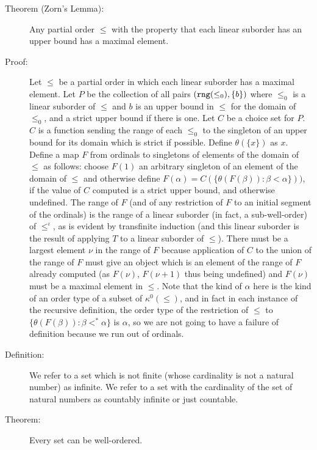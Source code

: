 \documentclass[12pt]{article}
\begin{document}
\begin{description}

\item[Theorem (Zorn's Lemma):]  Any partial order $\leq$ with the property that each linear suborder has an upper bound  has a maximal element.

\item[Proof:]  Let $\leq$ be a partial order in which each linear suborder has a maximal element.  Let $P$ be the collection of all pairs $({\tt rng}(\leq_0),\{b\})$ where $\leq_0$ is a linear suborder of $\leq$ and $b$ is an upper bound in $\leq$ for the domain of $\leq_0$, and a strict upper bound if there is one.  Let $C$ be a choice set for $P$.  $C$ is a function sending the range of each $\leq_0$ to
the singleton of an upper bound for its domain which is strict if possible.  Define $\theta(\{x\})$ as $x$.  Define a map $F$ from ordinals to singletons of elements of the domain of $\leq$ as follows: choose $F(1)$ an arbitrary singleton of an element of the domain of $\leq$ and otherwise define  $F(\alpha) =  C(\{\theta(F(\beta)):\beta<\alpha\}))$, if the value of $C$ computed is a strict upper bound, and otherwise undefined.  The range of $F$ (and of any restriction of $F$ to an initial segment of the ordinals)  is the range of a linear suborder (in fact, a sub-well-order) of $\leq^{\iota}$, as is evident by transfinite induction (and this linear suborder is the result of applying $T$ to a linear suborder of $\leq$).  There must be a largest element $\nu$ in
the range of $F$ because application of $C$ to  the union of the range of $F$ must give an object which is an element of the range of $F$ already computed (as $F(\nu)$, $F(\nu+1)$ thus being undefined) and $F(\nu)$ must be a maximal element in $\leq$.  Note that the kind of $\alpha$ here is the kind of an order type of a subset of $\kappa^0(\leq)$, and in fact in each instance of the recursive definition, the order type of the restriction of $\leq$ to $\{\theta(F(\beta)):\beta<^*\alpha\}$ is $\alpha$, so we are not going to have a failure of definition because we run out of ordinals.

\item[Definition:]  We refer to a set which is not finite (whose cardinality is not a natural number) as infinite.  We refer to a set with the cardinality of the set of natural numbers as countably infinite or just countable.

\item[Theorem:]  Every set can be well-ordered.


\end{description}
\end{document}
